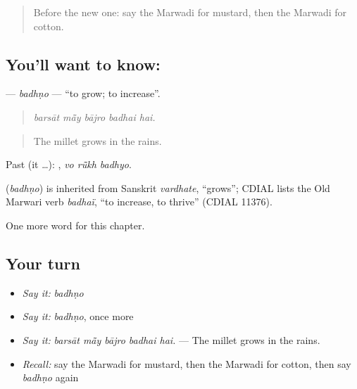 \label{lesson:MW-C239-badhno-grow}



\begin{quote}
Before the new one: say the Marwadi for mustard, then the Marwadi for cotton.
\end{quote}

\subsection*{You'll want to know: }
\textbf{} — \emph{badhṇo} — \textquotedblleft{}to grow; to increase\textquotedblright{}.

\begin{quote}
    
\end{quote}

\begin{quote}
\emph{barsāt mā̃y bājro badhai hai.}
\end{quote}

\begin{quote}
The millet grows in the rains.
\end{quote}

Past (it …):   , \emph{vo rū̃kh badhyo}.

\begin{cousinweb}
\textbf{} (\emph{badhṇo}) is inherited from Sanskrit \emph{vardhate}, \textquotedblleft{}grows\textquotedblright{}; CDIAL lists the Old Marwari verb \emph{badhaï}, \textquotedblleft{}to increase, to thrive\textquotedblright{} (CDIAL 11376).
\end{cousinweb}

\begin{grammarlens}[title={What you've built}]
One more word for this chapter.
\end{grammarlens}

\subsection*{Your turn}
\begin{itemize}
\raggedright
  \item \emph{Say it:} \emph{badhṇo}
  \item \emph{Say it:} \emph{badhṇo}, once more
  \item \emph{Say it:} \emph{barsāt mā̃y bājro badhai hai.} — The millet grows in the rains.
  \item \emph{Recall:} say the Marwadi for mustard, then the Marwadi for cotton, then say \emph{badhṇo} again
\end{itemize}

